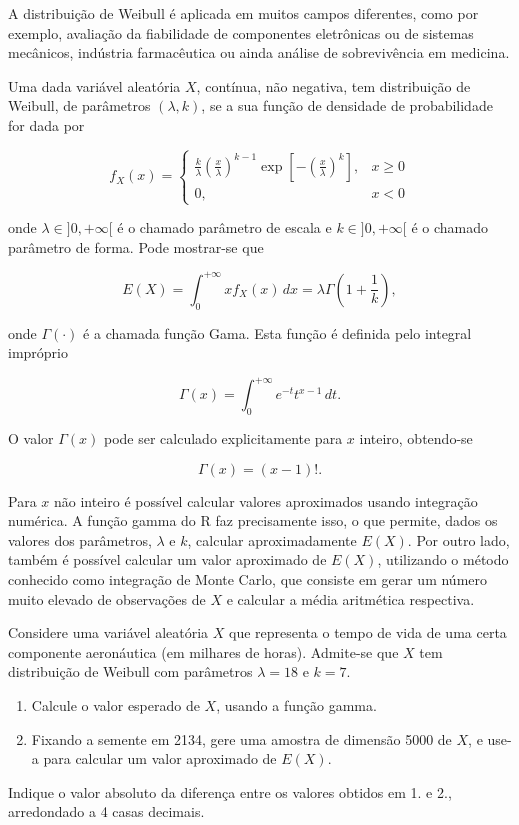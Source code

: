 \documentclass[11pt,a4paper]{article}
\begin{document}
\begin{tcolorbox}[colback=blue!5!white,colframe=blue!75!black,title=Distribuição de Weibull - Exercício 4]

A distribuição de Weibull é aplicada em muitos campos diferentes, como por exemplo, avaliação da fiabilidade de componentes eletrônicas ou de sistemas mecânicos, indústria farmacêutica ou ainda análise de sobrevivência em medicina.

Uma dada variável aleatória \( X \), contínua, não negativa, tem distribuição de Weibull, de parâmetros \( (\lambda, k) \), se a sua função de densidade de probabilidade for dada por

\[
f_X(x) =
\begin{cases} 
\frac{k}{\lambda} \left( \frac{x}{\lambda} \right)^{k-1} \exp \left[ - \left( \frac{x}{\lambda} \right)^k \right], & x \geq 0 \\
0, & x < 0
\end{cases}
\]

onde \( \lambda \in ]0, +\infty [ \) é o chamado parâmetro de escala e \( k \in ]0, +\infty [ \) é o chamado parâmetro de forma. Pode mostrar-se que

\[
E(X) = \int_0^{+\infty} x f_X(x) \, dx = \lambda \Gamma \left( 1 + \frac{1}{k} \right),
\]

onde \( \Gamma(\cdot) \) é a chamada função Gama. Esta função é definida pelo integral impróprio

\[
\Gamma(x) = \int_0^{+\infty} e^{-t} t^{x - 1} \, dt.
\]

O valor \( \Gamma(x) \) pode ser calculado explicitamente para \( x \) inteiro, obtendo-se

\[
\Gamma(x) = (x - 1)!.
\]

Para \( x \) não inteiro é possível calcular valores aproximados usando integração numérica. A função gamma do R faz precisamente isso, o que permite, dados os valores dos parâmetros, \( \lambda \) e \( k \), calcular aproximadamente \( E(X) \). Por outro lado, também é possível calcular um valor aproximado de \( E(X) \), utilizando o método conhecido como integração de Monte Carlo, que consiste em gerar um número muito elevado de observações de \( X \) e calcular a média aritmética respectiva.

Considere uma variável aleatória \( X \) que representa o tempo de vida de uma certa componente aeronáutica (em milhares de horas). Admite-se que \( X \) tem distribuição de Weibull com parâmetros \( \lambda = 18 \) e \( k = 7 \).

\begin{enumerate}
    \item Calcule o valor esperado de \( X \), usando a função gamma.
    \item Fixando a semente em 2134, gere uma amostra de dimensão 5000 de \( X \), e use-a para calcular um valor aproximado de \( E(X) \).
\end{enumerate}

Indique o valor absoluto da diferença entre os valores obtidos em 1. e 2., arredondado a 4 casas decimais.

\end{tcolorbox}
\end{document}
